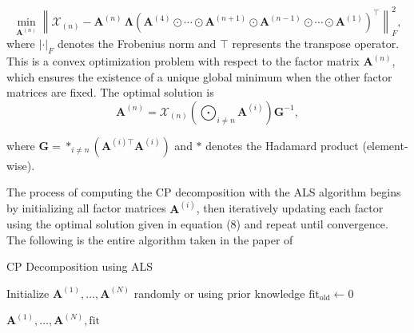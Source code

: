 \documentclass[pdflatex,sn-mathphys-num]{sn-jnl}
\theoremstyle{thmstyleone}
\theoremstyle{thmstyletwo}
\theoremstyle{thmstylethree}
\begin{document}
\begin{equation}
\min_{\mathbf{A}^{(n)}} \left\| \mathcal{X}_{(n)} - \mathbf{A}^{(n)} \, \boldsymbol{\Lambda} 
\left( \mathbf{A}^{(4)} \odot \cdots \odot \mathbf{A}^{(n+1)} \odot \mathbf{A}^{(n-1)} \odot \cdots \odot \mathbf{A}^{(1)} \right)^\top 
\right\|_F^2,
\end{equation}
\noindent where $\left|\cdot\right|_{F}$ denotes the Frobenius norm and $\top$ represents the transpose operator. This is a convex optimization problem with respect to the factor matrix $\mathbf{A}^{(n)}$, which ensures the existence of a unique global minimum when the other factor matrices are fixed. The optimal solution is
\begin{equation}
\mathbf{A}^{(n)} = \mathcal{X}_{(n)} 
\left( \bigodot_{i \neq n} \mathbf{A}^{(i)} \right) 
\mathbf{G}^{-1},
\end{equation}

\noindent where 
$
\mathbf{G} = \ast_{i \neq n} \left( \mathbf{A}^{(i)\top} \mathbf{A}^{(i)} \right) 
$ and $\ast$ denotes the Hadamard product (element-wise). 

The process of computing the CP decomposition with the ALS algorithm begins by initializing all factor matrices $\mathbf{A}^{(i)}$, then iteratively updating each factor using the optimal solution given in equation (8) and repeat until convergence. The following is the entire algorithm taken in the paper of \cite{kruskal1977three}

\begin{algorithm}[H]
\caption{CP Decomposition using ALS }

Initialize $\mathbf{A}^{(1)}, \ldots, \mathbf{A}^{(N)}$ randomly or using prior knowledge\;
$\text{fit}_{\text{old}} \gets 0$\;

\Return $\mathbf{A}^{(1)}, \ldots, \mathbf{A}^{(N)}, \text{fit}$\;
\end{algorithm}
\end{document}
